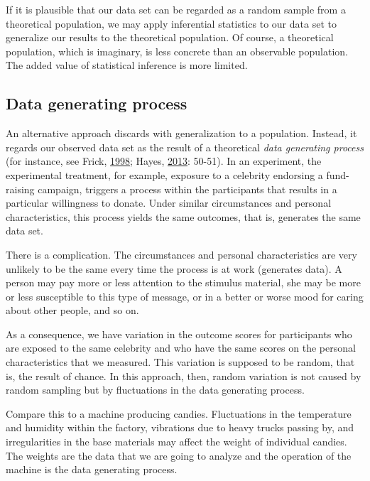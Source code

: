 \documentclass[a4paper]{book}
\theoremstyle{definition}
\theoremstyle{definition}
\theoremstyle{definition}
\theoremstyle{remark}
\begin{document}
If it is plausible that our data set can be regarded as a random sample
from a theoretical population, we may apply inferential statistics to
our data set to generalize our results to the theoretical population. Of
course, a theoretical population, which is imaginary, is less concrete
than an observable population. The added value of statistical inference
is more limited.

\subsection{Data generating process}\label{data-generating-process}

An alternative approach discards with generalization to a population.
Instead, it regards our observed data set as the result of a theoretical
\emph{data generating process} (for instance, see Frick,
\protect\hyperlink{ref-RefWorks:3925}{1998}; Hayes,
\protect\hyperlink{ref-RefWorks:3873}{2013}: 50-51). In an experiment,
the experimental treatment, for example, exposure to a celebrity
endorsing a fund-raising campaign, triggers a process within the
participants that results in a particular willingness to donate. Under
similar circumstances and personal characteristics, this process yields
the same outcomes, that is, generates the same data set.

There is a complication. The circumstances and personal characteristics
are very unlikely to be the same every time the process is at work
(generates data). A person may pay more or less attention to the
stimulus material, she may be more or less susceptible to this type of
message, or in a better or worse mood for caring about other people, and
so on.

As a consequence, we have variation in the outcome scores for
participants who are exposed to the same celebrity and who have the same
scores on the personal characteristics that we measured. This variation
is supposed to be random, that is, the result of chance. In this
approach, then, random variation is not caused by random sampling but by
fluctuations in the data generating process.

Compare this to a machine producing candies. Fluctuations in the
temperature and humidity within the factory, vibrations due to heavy
trucks passing by, and irregularities in the base materials may affect
the weight of individual candies. The weights are the data that we are
going to analyze and the operation of the machine is the data generating
process.
\end{document}
